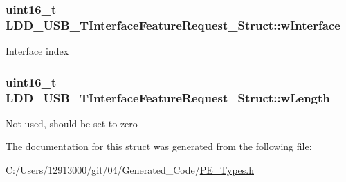 \subsubsection[{w\+Interface}]{\setlength{\rightskip}{0pt plus 5cm}uint16\+\_\+t L\+D\+D\+\_\+\+U\+S\+B\+\_\+\+T\+Interface\+Feature\+Request\+\_\+\+Struct\+::w\+Interface}\label{struct_l_d_d___u_s_b___t_interface_feature_request___struct_afc1da433b4a02f8c6a6ed6ce8b3065da}
Interface index \hypertarget{struct_l_d_d___u_s_b___t_interface_feature_request___struct_a5f54f1e83024342d9d63aad374a117ba}{}
\subsubsection[{w\+Length}]{\setlength{\rightskip}{0pt plus 5cm}uint16\+\_\+t L\+D\+D\+\_\+\+U\+S\+B\+\_\+\+T\+Interface\+Feature\+Request\+\_\+\+Struct\+::w\+Length}\label{struct_l_d_d___u_s_b___t_interface_feature_request___struct_a5f54f1e83024342d9d63aad374a117ba}
Not used, should be set to zero 

The documentation for this struct was generated from the following file\+:\begin{DoxyCompactItemize}
\item 
C\+:/\+Users/12913000/git/04/\+Generated\+\_\+\+Code/\hyperlink{_p_e___types_8h}{P\+E\+\_\+\+Types.\+h}\end{DoxyCompactItemize}
